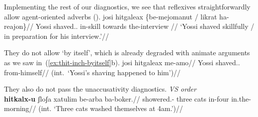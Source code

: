 
%
%
%

Implementing the rest of our diagnostics, we see that reflexives straightforwardly allow agent-oriented adverbs (\nextx).
\ex
	\begingl
		\gla josi hitgaleax \{be-mejomanut / likrat ha-reajon\}//
		\glb Yossi shaved.. in-skill {} towards the-interview //
		\glft `Yossi shaved skillfully / in preparation for his interview.'//
	\endgl
\xe

They do not allow `by itself', which is already degraded with animate arguments as we saw in~(\ref{ex:thit-inch-byitself}b).
\ex \ljudge{*}
	\begingl
		\gla josi hitgaleax me-a{\ts}mo//
		\glb Yossi shaved.. from-himself//
		\glft (int.~`Yossi's shaving happened to him')//
	\endgl
\xe

They also do not pass the unaccusativity diagnostics.
\ex \textit{VS order}\\
	\begingl
	\gla \ljudge{\#}\textbf{hitkalx-u} ʃloʃa xatulim be-arba ba-boker.//
	\glb showered.- three cats in-four in.the-morning//
	\glft (int. `Three cats washed themselves at 4am.')//
	\endgl
\xe

